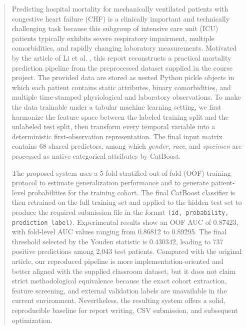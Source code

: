 \documentclass[a4paper,12pt]{extreport}
\begin{document}
\newpage

\begin{abstract}
Predicting hospital mortality for mechanically ventilated patients with congestive heart failure (CHF) is a clinically important and technically challenging task because this subgroup of intensive care unit (ICU) patients typically exhibits severe respiratory impairment, multiple comorbidities, and rapidly changing laboratory measurements. Motivated by the article of Li et al. \cite{li2022prediction}, this report reconstructs a practical mortality prediction pipeline from the preprocessed dataset supplied in the course project. The provided data are stored as nested Python pickle objects in which each patient contains static attributes, binary comorbidities, and multiple time-stamped physiological and laboratory observations. To make the data trainable under a tabular machine learning setting, we first harmonize the feature space between the labeled training split and the unlabeled test split, then transform every temporal variable into a deterministic first-observation representation. The final input matrix contains 68 shared predictors, among which \textit{gender}, \textit{race}, and \textit{specimen} are processed as native categorical attributes by CatBoost.

The proposed system uses a 5-fold stratified out-of-fold (OOF) training protocol to estimate generalization performance and to generate patient-level probabilities for the training cohort. The final CatBoost classifier is then retrained on the full training set and applied to the hidden test set to produce the required submission file in the format \texttt{(id, probability, prediction\_label)}. Experimental results show an OOF AUC of 0.87423, with fold-level AUC values ranging from 0.86812 to 0.89295. The final threshold selected by the Youden statistic is 0.430342, leading to 737 positive predictions among 2{,}043 test patients. Compared with the original article, our reproduced pipeline is more implementation-oriented and better aligned with the supplied classroom dataset, but it does not claim strict methodological equivalence because the exact cohort extraction, feature screening, and external validation labels are unavailable in the current environment. Nevertheless, the resulting system offers a solid, reproducible baseline for report writing, CSV submission, and subsequent optimization.
\end{abstract}
\end{document}
